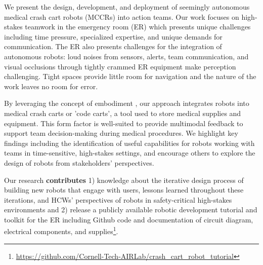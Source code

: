 We present the design, development, and deployment of seemingly autonomous medical crash cart robots (MCCRs) into action teams. 
Our work focuses on high-stakes teamwork in the emergency room (ER) which presents unique challenges including time pressure, specialized expertise, and unique demands for communication. 
The ER also presents challenges for the integration of autonomous robots: loud noises from sensors, alerts, team communication, and visual occlusions through tightly crammed ER equipment make perception challenging. 
Tight spaces provide little room for navigation and the nature of the work leaves no room for error.

By leveraging the concept of embodiment \cite{massaro1990psychology}, our approach integrates robots into medical crash carts or 'code carts', a tool used to store medical supplies and equipment. This form factor is well-suited to provide multimodal feedback to support team decision-making during medical procedures. 
We highlight key findings %
including the identification of useful capabilities for robots working with teams in time-sensitive, high-stakes settings, and encourage others to explore the design of robots from stakeholders' perspectives.%


Our research \textbf{contributes} 1) knowledge about the iterative design process of building new robots that engage with users, lessons learned throughout these iterations, and HCWs' perspectives of robots in safety-critical high-stakes environments and 2) release a publicly available robotic development tutorial and toolkit for the ER including Github code and documentation of circuit diagram, electrical components, and supplies\footnote{\url{https://github.com/Cornell-Tech-AIRLab/crash\_cart\_robot\_tutorial}}.%


